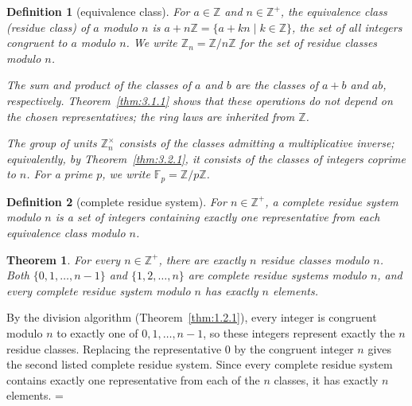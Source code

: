 \documentclass[11pt]{article}
\makeatletter
\let\nt@closedisplay\]
\def\nt@guardedclose{\@ifnextchar\par{\nt@closeafterpar}{\@ifnextchar\end{\postdisplaypenalty\@M\nt@closedisplay}{\nt@closedisplay}}}
\def\nt@closeafterpar\par{\@ifnextchar\par{\nt@closeafterpar}{\@ifnextchar\end{\postdisplaypenalty\@M\nt@closedisplay\par}{\nt@closedisplay\par}}}
\renewenvironment{proof}[1][\proofname]{\par
  \pushQED{\qed}\normalfont\topsep\medskipamount\edef\nt@afterproof{\@endparpenalty=\the\@endparpenalty\relax}\@beginparpenalty\@M\@endparpenalty\@M\let\]\nt@guardedclose\trivlist\item[]\textit{#1\@addpunct{.}} \ignorespaces}{\ifvmode\addpenalty\@M\fi\popQED\nt@afterproof\endtrivlist\@endpefalse}
\theoremstyle{ntstyle}
\newtheorem{theorem}{Theorem}[subsection]
\newtheorem{definition}{Definition}[subsection]
\newcommand{\ZmodUnits}[1]{\mathbb{Z}_{#1}^{\times}}
\makeatother
\begin{document}
\begin{definition}[equivalence class]\label{def:3.2.2}\label{def:equivalence-class}
  For $a\in\mathbb{Z}$ and $n\in\mathbb{Z}^+$, the
  equivalence class (residue class) of $a$ modulo $n$ is
  $a+n\mathbb{Z}=\{a+kn\mid k\in\mathbb{Z}\}$, the set of all integers
  congruent to $a$ modulo $n$. We write $\mathbb{Z}_n=\mathbb{Z}/n\mathbb{Z}$
  for the set of residue classes modulo $n$.

  The sum and product of the classes of $a$ and $b$ are the classes of $a+b$ and $ab$, respectively.
  Theorem~\ref{thm:3.1.1} shows that these operations do not depend on the
  chosen representatives; the ring laws are inherited from $\mathbb{Z}$.

  The group of units $\ZmodUnits{n}$ consists of the classes admitting
  a multiplicative inverse; equivalently, by Theorem~\ref{thm:3.2.1},
  it consists of the classes of integers coprime to $n$. For a prime $p$, we write
  $\mathbb{F}_p=\mathbb{Z}/p\mathbb{Z}$.

\end{definition}

\begin{definition}[complete residue system]\label{def:3.2.3}\label{def:complete-residue-system}
  For $n\in\mathbb{Z}^+$, a
  complete residue system modulo $n$ is a set of integers containing
  exactly one representative from each equivalence class modulo $n$.

\end{definition}

\begin{theorem}\label{thm:3.2.4} For every $n\in\mathbb{Z}^+$, there are exactly $n$ residue
  classes modulo $n$. Both $\{0,1,\ldots,n-1\}$ and
  $\{1,2,\ldots,n\}$ are complete residue systems modulo $n$, and every
  complete residue system modulo $n$ has exactly $n$ elements.

\end{theorem}

\begin{proof} By the division algorithm (Theorem~\ref{thm:1.2.1}),
  every integer is congruent modulo $n$ to exactly one of
  $0,1,\ldots,n-1$, so these integers represent exactly the $n$ residue
  classes. Replacing the representative $0$ by the congruent integer $n$
  gives the second listed complete residue system. Since every complete
  residue system contains exactly one representative from each of the $n$
  classes, it has exactly $n$ elements.
\end{proof}
\end{document}
